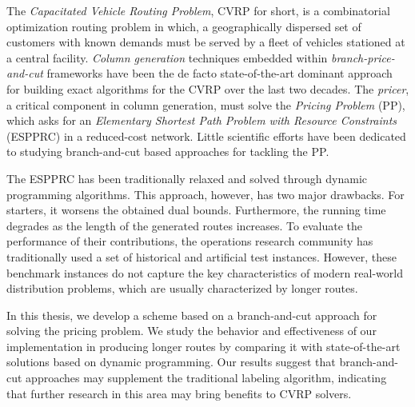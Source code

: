 {
\setlength\parindent{0pt}

The \textit{Capacitated Vehicle Routing Problem}, CVRP for short,
is a combinatorial optimization routing problem in which,
a geographically dispersed set of customers with known demands
must be served by a fleet of vehicles stationed at a central facility.
\textit{Column generation} techniques embedded within \textit{branch-price-and-cut} frameworks
have been the de facto state-of-the-art dominant approach
for building exact algorithms for the CVRP over the last two decades.
The \textit{pricer}, a critical component in column generation, must solve
the \textit{Pricing Problem} (PP), which asks for an
\textit{Elementary Shortest Path Problem with Resource Constraints} (ESPPRC)
in a reduced-cost network.
Little scientific efforts have been dedicated to studying
branch-and-cut based approaches for tackling the PP.

The ESPPRC has been traditionally relaxed and solved through dynamic programming algorithms.
This approach, however, has two major drawbacks.
For starters, it worsens the obtained dual bounds.
Furthermore, the running time degrades as the length of the generated routes increases.
To evaluate the performance of their contributions, the operations research community has traditionally used a set of historical and artificial test instances.
However, these benchmark instances do not capture the key characteristics of modern real-world distribution problems, which are usually characterized by longer routes.

In this thesis, we develop
a scheme based on a branch-and-cut approach for solving the pricing problem.
We study the behavior and effectiveness of our implementation in producing longer routes by comparing it with state-of-the-art solutions based on dynamic programming.
Our results suggest that branch-and-cut approaches may supplement the traditional labeling algorithm, indicating that further research in this area may bring benefits to CVRP solvers.
}
